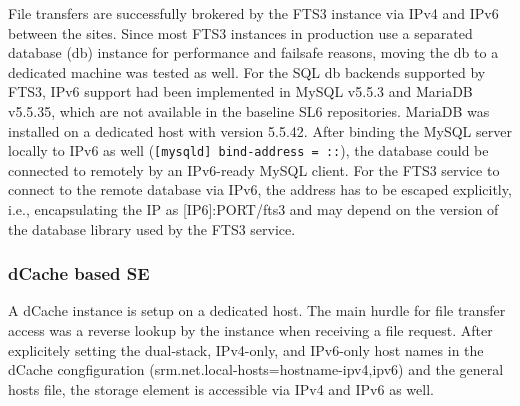 File transfers are successfully brokered by the FTS3 instance via IPv4 and IPv6 between the sites. Since most FTS3 instances in production use a separated database (db) instance for performance and failsafe reasons, moving the db to a dedicated machine was tested as well. For the SQL db backends supported by FTS3, IPv6 support had been implemented in MySQL v5.5.3 and MariaDB v5.5.35, which are not available in the baseline SL6 repositories. MariaDB was installed on a dedicated host with version 5.5.42. After binding the MySQL server locally to IPv6 as well (\texttt{[mysqld] bind-address = ::}), the database could be connected to remotely by an IPv6-ready MySQL client. For the FTS3 service to connect to the remote database via IPv6, the address has to be escaped explicitly, i.e., encapsulating the IP as [IP6]:PORT/fts3 and may depend on the version of the database library used by the FTS3 service.

\subsubsection{dCache based SE}
A dCache instance is setup on a dedicated host. The main hurdle for file transfer access was a reverse lookup by the instance when receiving a file request. After explicitely setting the dual-stack, IPv4-only, and IPv6-only host names in the dCache congfiguration (srm.net.local-hosts=hostname-ipv4,ipv6) and the general hosts file, the storage element is accessible via IPv4 and IPv6 as well.
